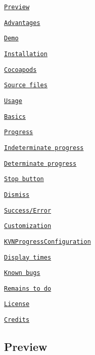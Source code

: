 \begin{DoxyItemize}
\item \href{#preview}{\tt Preview}
\item \href{#advantages}{\tt Advantages}
\item \href{#demo}{\tt Demo}
\item \href{#installation}{\tt Installation}
\begin{DoxyItemize}
\item \href{#cocoapods}{\tt Cocoapods}
\item \href{#source-files}{\tt Source files}
\end{DoxyItemize}
\item \href{#usage}{\tt Usage}
\begin{DoxyItemize}
\item \href{#basics}{\tt Basics}
\item \href{#progress}{\tt Progress}
\begin{DoxyItemize}
\item \href{#indeterminate-progress}{\tt Indeterminate progress}
\item \href{#determinate-progress}{\tt Determinate progress}
\item \href{#stop-button}{\tt Stop button}
\end{DoxyItemize}
\item \href{#dismiss}{\tt Dismiss}
\item \href{#successerror}{\tt Success/\+Error}
\end{DoxyItemize}
\item \href{#customization}{\tt Customization}
\begin{DoxyItemize}
\item \href{#KVNProgressConfiguration}{\tt K\+V\+N\+Progress\+Configuration}
\item \href{#display-times}{\tt Display times}
\end{DoxyItemize}
\item \href{#known-bugs}{\tt Known bugs}
\item \href{#remains-to-do}{\tt Remains to do}
\item \href{#license}{\tt License}
\item \href{#credits}{\tt Credits}
\end{DoxyItemize}





\subsection*{Preview}

